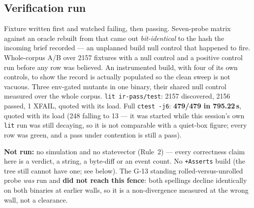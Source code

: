 \subsection*{Verification run}
Fixture written first and watched failing, then passing. Seven-probe matrix against an oracle
rebuilt from  that came out \emph{bit-identical} to the hash the incoming brief
recorded --- an unplanned build null control that happened to fire. Whole-corpus A/B over 2157
fixtures with a null control and a positive control run before any row was believed. An
instrumented build, with four of its own controls, to show the record is actually populated so
the clean sweep is not vacuous. Three env-gated mutants in one binary, their shared null control
measured over the whole corpus. \texttt{lit ir-pass/test}: 2157 discovered, 2156 passed, 1 XFAIL,
quoted with its load. Full \texttt{ctest -j6}: \textbf{479/479 in 795.22\,s}, quoted with its load (248 falling to 13 --- it was started while this session's own \texttt{lit} run was still decaying, so it is not comparable with a quiet-box figure; every row was green, and a pass under contention is still a pass).

\textbf{Not run:} no simulation and no statevector (Rule~2) --- every correctness claim here is a
verdict, a string, a byte-diff or an event count. No \texttt{+Asserts} build (the tree still
cannot have one; see below). The G-13 standing rolled-versus-unrolled probe \emph{was} run and
\textbf{did not reach this fence}: both spellings decline identically on both binaries at earlier
walls, so it is a non-divergence measured at the wrong wall, not a clearance.

